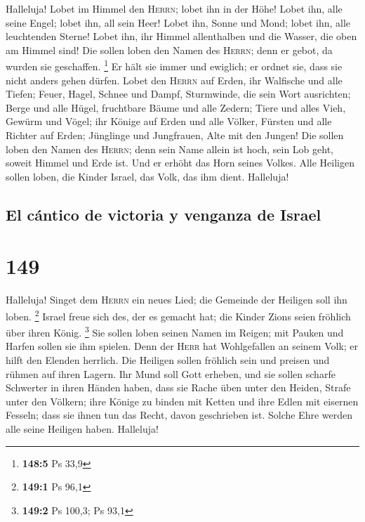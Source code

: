  Halleluja! Lobet im Himmel den \textsc{Herrn}; lobet ihn
in der Höhe!  Lobet ihn, alle seine Engel; lobet ihn, all
sein Heer!  Lobet ihn, Sonne und Mond; lobet ihn, alle
leuchtenden Sterne!  Lobet ihn, ihr Himmel allenthalben
und die Wasser, die oben am Himmel sind!  Die sollen loben
den Namen des \textsc{Herrn}; denn er gebot, da wurden sie geschaffen.
\footnote{\textbf{148:5} Ps 33,9}  Er hält sie immer und
ewiglich; er ordnet sie, dass sie nicht anders gehen dürfen.
 Lobet den \textsc{Herrn} auf Erden, ihr Walfische und
alle Tiefen;  Feuer, Hagel, Schnee und Dampf, Sturmwinde,
die sein Wort ausrichten;  Berge und alle Hügel,
fruchtbare Bäume und alle Zedern;  Tiere und alles Vieh,
Gewürm und Vögel;  ihr Könige auf Erden und alle Völker,
Fürsten und alle Richter auf Erden;  Jünglinge und
Jungfrauen, Alte mit den Jungen!  Die sollen loben den
Namen des \textsc{Herrn}; denn sein Name allein ist hoch, sein Lob geht,
soweit Himmel und Erde ist.  Und er erhöht das Horn
seines Volkes. Alle Heiligen sollen loben, die Kinder Israel, das Volk,
das ihm dient. Halleluja!

\hypertarget{el-cuxe1ntico-de-victoria-y-venganza-de-israel}{%
\subsection{El cántico de victoria y venganza de
Israel}\label{el-cuxe1ntico-de-victoria-y-venganza-de-israel}}

\hypertarget{section-148}{%
\section{149}\label{section-148}}

 Halleluja! Singet dem \textsc{Herrn} ein neues Lied; die
Gemeinde der Heiligen soll ihn loben. \footnote{\textbf{149:1} Ps 96,1}
 Israel freue sich des, der es gemacht hat; die Kinder
Zions seien fröhlich über ihren König. \footnote{\textbf{149:2} Ps
  100,3; Ps 93,1}  Sie sollen loben seinen Namen im
Reigen; mit Pauken und Harfen sollen sie ihm spielen. 
Denn der \textsc{Herr} hat Wohlgefallen an seinem Volk; er hilft den
Elenden herrlich.  Die Heiligen sollen fröhlich sein und
preisen und rühmen auf ihren Lagern.  Ihr Mund soll Gott
erheben, und sie sollen scharfe Schwerter in ihren Händen haben,
 dass sie Rache üben unter den Heiden, Strafe unter den
Völkern;  ihre Könige zu binden mit Ketten und ihre Edlen
mit eisernen Fesseln;  dass sie ihnen tun das Recht, davon
geschrieben ist. Solche Ehre werden alle seine Heiligen haben.
Halleluja!

